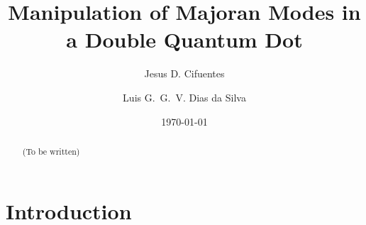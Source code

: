 \documentclass[showpacs,aps,prb,reprint,superscriptaddress]{revtex4-1}
\begin{document}
\newcommand{\be}   {\begin{equation}}
\newcommand{\ee}   {\end{equation}}
\newcommand{\ba}   {\begin{eqnarray}}
\newcommand{\ea}   {\end{eqnarray}}
\newcommand{\ve}  {\varepsilon}

\newcommand{\nhat}{\hat{n}}
\newcommand{\veck}{\textbf{k}}
\newcommand\ep{\epsilon}
\newcommand\g{\gamma}
\newcommand\s{\sigma}
\newcommand\up{\uparrow}
\newcommand\dw{\downarrow}
\newcommand\down{\downarrow}
\newcommand{\ed}[1]{\ep_{d#1}}
\newcommand{\ket}[1]{\vert #1 \rangle}
\newcommand{\ann}{a^{\dagger}}
\newcommand{\dann}{d^{\dagger}}
\newcommand{\tdots}{t_{dots}}
\newcommand{\gammaA}[1]{\gamma_{A,#1}}
\newcommand{\gammaB}[1]{\gamma_{B,#1}}
\newcommand{\Green}[1]{G_{#1}(\omega) }

\newcommand{\GreenG}[2]{G_{#1}^{ #2} (\omega) }

\newcommand{\super}{\vert \Delta \vert}





\title{ Manipulation of Majoran Modes in a Double Quantum Dot }

\author{Jesus D. Cifuentes}
\author{Luis G.~G.~V. Dias da Silva}

\date{ \today }

\begin{abstract}

(To be written)


\end{abstract} 

\maketitle


\section{Introduction}
\label{sec:Intro}
\end{document}
